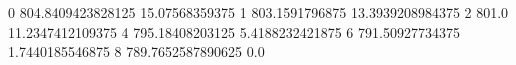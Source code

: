 0 804.8409423828125 15.07568359375
1 803.1591796875 13.3939208984375
2 801.0 11.2347412109375
4 795.18408203125 5.4188232421875
6 791.50927734375 1.7440185546875
8 789.7652587890625 0.0
